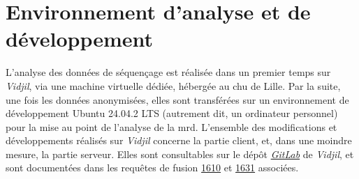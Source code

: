 \section{Environnement d'analyse et de développement}

L'analyse des données de séquençage est réalisée dans un premier temps sur \textit{Vidjil}, via une machine virtuelle dédiée,
hébergée au \gls{chu} de Lille. Par la suite, une fois les données anonymisées, elles sont transférées sur un environnement de 
développement Ubuntu 24.04.2 LTS (autrement dit, un ordinateur personnel) pour la mise au point de l'analyse de la \gls{mrd}.
L'ensemble des modifications et développements réalisés sur \textit{Vidjil} concerne la partie client, et, dans une moindre mesure,
la partie serveur. Elles sont consultables sur le dépôt \href{https://gitlab.inria.fr/users/x-benha/activity}{\textit{GitLab}}
de \textit{Vidjil}, et sont documentées dans les requêtes de fusion \href{https://gitlab.inria.fr/vidjil/vidjil/-/merge_requests/1610}{1610}
et \href{https://gitlab.inria.fr/vidjil/vidjil/-/merge_requests/1631}{1631} associées.


